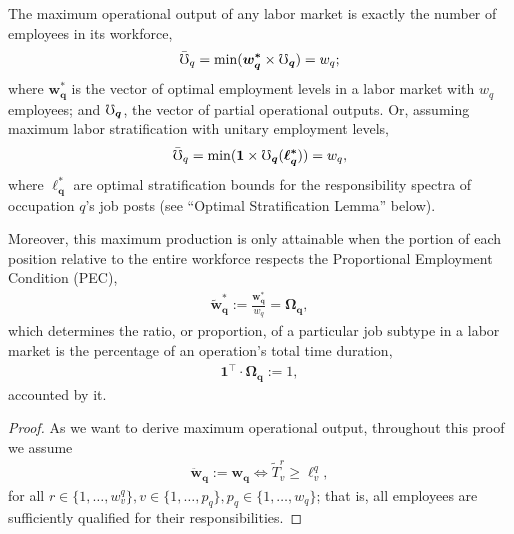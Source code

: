\documentclass[hidelinks, nonatbib]{elsarticle}
\begin{document}
\begin{lemma}
    The maximum operational output of any labor market is exactly the number of employees in its workforce,
    \begin{gather}
        \bar{\mho}_{q}
        =
        \min(
            \boldsymbol{w_{q}^{*}}
            \times
            \boldsymbol{\mho_q}
        )
        = w_q
        ;
    \end{gather}
    where $\boldsymbol{w_{q}^{*}}$ is the vector of optimal employment levels in a labor market with $w_q$ employees; and $\boldsymbol{\mho_q}$, the vector of partial operational outputs. Or, assuming maximum labor stratification with unitary employment levels,
    \begin{gather}
        \bar{\mho}_{q}
        =
        \min(
            \boldsymbol{1}
            \times
            \boldsymbol{\mho_q}(
                \boldsymbol{\ell_{q}^{*}}
            )
        )
        = w_q
        ,
    \end{gather}
    where $\boldsymbol{\ell_{q}^{*}}$ are optimal stratification bounds for the responsibility spectra of occupation $q$'s job posts (see ``Optimal Stratification Lemma'' below).
    
    Moreover, this maximum production is only attainable when the portion of each position relative to the entire workforce respects the Proportional Employment Condition (PEC),
    \begin{gather}
        \boldsymbol{\tilde{w}_{q}^{*}}
        :=
        \frac{
            \boldsymbol{w_{q}^{*}}
        }{
            w_q
        }
        =
        \boldsymbol{\Omega_{q}}
        ,
    \end{gather}
    which determines the ratio, or proportion, of a particular job subtype in a labor market is the percentage of an operation's total time duration,
    \begin{gather}
        \boldsymbol{1} ^ {\top}
        \cdot
        \boldsymbol{\Omega_{q}}
        := 1
        ,
    \end{gather}
    accounted by it.
    
    \begin{proof}
        As we want to derive maximum operational output, throughout this proof we assume
        \begin{gather}
            \boldsymbol{\ddot{w}_{q}}
            :=
            \boldsymbol{w_q}
            \iff
            \tilde{T}_{v}^{r}
            \geq
            \ell_{v}^{q}
            ,
        \end{gather}
        for all $
        r \in \{1, \dots, w_{v}^{q}\}
        ,
        v \in \{1, \dots, p_q\}
        ,
        p_q \in \{1, \dots, w_q\}
        $; that is, all employees are sufficiently qualified for their responsibilities.
        

\end{proof}
\end{lemma}
\end{document}
